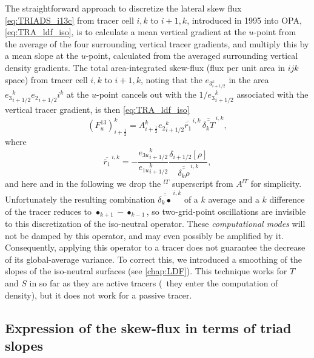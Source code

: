 \documentclass[../main/NEMO_manual]{subfiles}
\begin{document}
The straightforward approach to discretize the lateral skew flux
\autoref{eq:TRIADS_i13c} from tracer cell $i,k$ to $i+1,k$, introduced in 1995 into OPA,
\autoref{eq:TRA_ldf_iso}, is to calculate a mean vertical gradient at the $u$-point from
the average of the four surrounding vertical tracer gradients, and multiply this by a mean slope at the $u$-point,
calculated from the averaged surrounding vertical density gradients.
The total area-integrated skew-flux (flux per unit area in $ijk$ space) from tracer cell $i,k$ to $i+1,k$,
noting that the $e_{{3}_{i+1/2}^k}$ in the area $e{_{3}}_{i+1/2}^k{e_{2}}_{i+1/2}i^k$ at the $u$-point cancels out with
the $1/{e_{3}}_{i+1/2}^k$ associated with the vertical tracer gradient, is then \autoref{eq:TRA_ldf_iso}
\[
  \left(F_u^{13} \right)_{i+\frac{1}{2}}^k = {A}_{i+\frac{1}{2}}^k
  {e_{2}}_{i+1/2}^k \overline{\overline
    r_1} ^{\,i,k}\,\overline{\overline{\delta_k T}}^{\,i,k},
\]
where
\[
  \overline{\overline
    r_1} ^{\,i,k} = -\frac{{e_{3u}}_{i+1/2}^k}{{e_{1u}}_{i+1/2}^k}
  \frac{\delta_{i+1/2} [\rho]}{\overline{\overline{\delta_k \rho}}^{\,i,k}},
\]
and here and in the following we drop the $^{lT}$ superscript from ${A^{lT}}$ for simplicity.
Unfortunately the resulting combination $\overline{\overline{\delta_k\bullet}}^{\,i,k}$ of a $k$ average and
a $k$ difference of the tracer reduces to $\bullet_{k+1}-\bullet_{k-1}$,
so two-grid-point oscillations are invisible to this discretization of the iso-neutral operator.
These \emph{computational modes} will not be damped by this operator, and may even possibly be amplified by it.
Consequently, applying this operator to a tracer does not guarantee the decrease of its global-average variance.
To correct this, we introduced a smoothing of the slopes of the iso-neutral surfaces (see \autoref{chap:LDF}).
This technique works for $T$ and $S$ in so far as they are active tracers
(\ie\ they enter the computation of density), but it does not work for a passive tracer.

\subsection{Expression of the skew-flux in terms of triad slopes}
\end{document}
